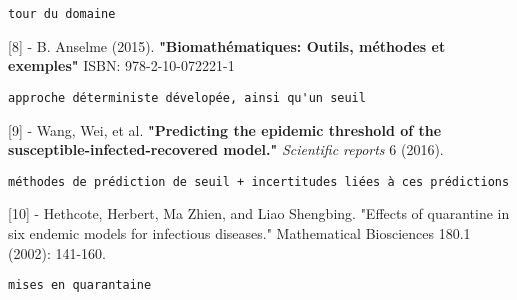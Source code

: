 \documentclass{article}
\begin{document}
\begin{verbatim}
tour du domaine
\end{verbatim}


[8] - B. Anselme (2015). \textbf{"Biomathématiques: Outils, méthodes et exemples"} ISBN: 978-2-10-072221-1


\begin{verbatim}
approche déterministe dévelopée, ainsi qu'un seuil
\end{verbatim}


[9] - Wang, Wei, et al. \textbf{"Predicting the epidemic threshold of the susceptible-infected-recovered model."} \textit{Scientific reports} 6 (2016).


\begin{verbatim}
méthodes de prédiction de seuil + incertitudes liées à ces prédictions
\end{verbatim}


[10] - Hethcote, Herbert, Ma Zhien, and Liao Shengbing. "Effects of quarantine in six endemic models for infectious diseases." Mathematical Biosciences 180.1 (2002): 141-160.


\begin{verbatim}
mises en quarantaine
\end{verbatim}
\end{document}
